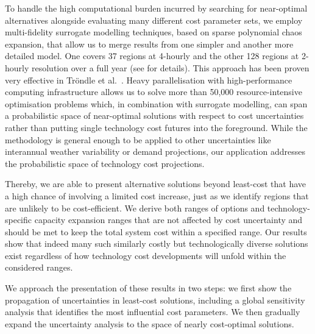 
To handle the high computational burden incurred by searching for near-optimal
alternatives alongside evaluating many different cost parameter sets, we employ
multi-fidelity surrogate modelling techniques, based on sparse polynomial chaos
expansion, that allow us to merge results from one simpler and another more
detailed model. One covers 37 regions at 4-hourly and the other 128 regions at
2-hourly resolution over a full year (see  for
details). This approach has been proven very effective in Tröndle et
al.~\cite{trondle_trade-offs_2020}. Heavy parallelisation with high-performance
computing infrastructure allows us to solve more than 50,000 resource-intensive
optimisation problems which, in combination with surrogate modelling, can span a
probabilistic space of near-optimal solutions with respect to cost uncertainties
rather than putting single technology cost futures into the foreground. While
the methodology is general enough to be applied to other uncertainties like
interannual weather variability or demand projections, our application addresses
the probabilistic space of technology cost projections.



Thereby, we are able to present alternative solutions beyond least-cost that
have a high chance of involving a limited cost increase, just as we identify
regions that are unlikely to be cost-efficient. We derive both ranges of options
and technology-specific capacity expansion ranges that are not affected by cost
uncertainty and should be met to keep the total system cost within a specified
range. Our results show that indeed many such similarly costly but
technologically diverse solutions exist regardless of how technology cost
developments will unfold within the considered ranges.

We approach the presentation of these results in two steps: we first show the
propagation of uncertainties in least-cost solutions, including a global
sensitivity analysis that identifies the most influential cost parameters. We
then gradually expand the uncertainty analysis to the space of nearly
cost-optimal solutions.





